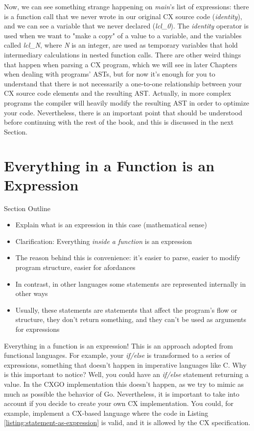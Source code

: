 \documentclass[11pt,fleqn,openany]{book} %
\begin{document}
Now, we can see something strange happening on \textit{main}'s list of expressions: there is a function call that we never wrote in our original CX source code (\textit{identity}), and we can see a variable that we never declared (\textit{lcl\_0}). The \textit{identity} operator is used when we want to "make a copy" of a value to a variable, and the variables called \textit{lcl\_N}, where \textit{N} is an integer, are used as temporary variables that hold intermediary calculations in nested function calls. There are other weird things that happen when parsing a CX program, which we will see in later Chapters when dealing with programs' ASTs, but for now it's enough for you to understand that there is not necessarily a one-to-one relationship between your CX source code elements and the resulting AST. Actually, in more complex programs the compiler will heavily modify the resulting AST in order to optimize your code. Nevertheless, there is an important point that should be understood before continuing with the rest of the book, and this is discussed in the next Section.

\section{Everything in a Function is an Expression}

\begin{remark}
Section Outline
    \begin{itemize}
    	\item Explain what is an expression in this case (mathematical sense)
        \item Clarification: Everything \textit{inside a function} is an expression
        \item The reason behind this is convenience: it's easier to parse, easier to modify program structure, easier for afordances
        \item In contrast, in other languages some statements are represented internally in other ways
        \item Usually, these statements are statements that affect the program's flow or structure, they don't return something, and they can't be used as arguments for expressions
    \end{itemize}
\end{remark}

Everything in a function is an expression! This is an approach adopted from functional languages. For example, your \textit{if/else} is transformed to a series of expressions, something that doesn't happen in imperative languages like C. Why is this important to notice? Well, you could have an \textit{if/else} statement returning a value. In the CXGO implementation this doesn't happen, as we try to mimic as much as possible the behavior of Go. Nevertheless, it is important to take into account if you decide to create your own CX implementation. You could, for example, implement a CX-based language where the code in Listing \ref{listing:statement-as-expression} is valid, and it is allowed by the CX specification.
\end{document}
